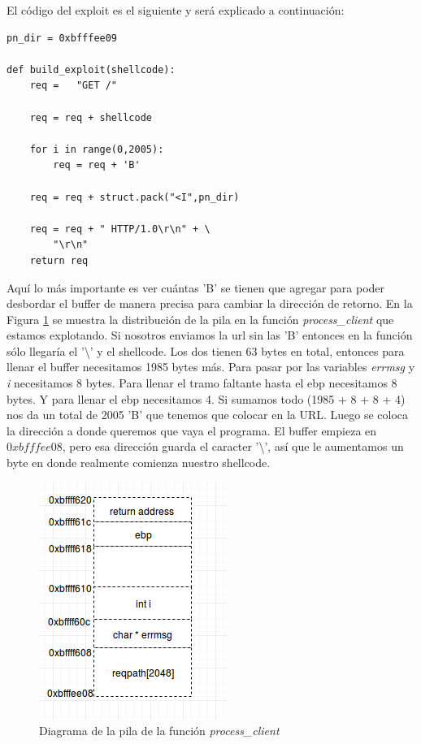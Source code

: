 \documentclass[a4paper,12pt]{article}
\begin{document}
El código del exploit es el siguiente y será explicado a continuación:

\begin{lstlisting}
pn_dir = 0xbfffee09

def build_exploit(shellcode):
    req =   "GET /"

    req = req + shellcode

    for i in range(0,2005):
        req = req + 'B'

    req = req + struct.pack("<I",pn_dir)

    req = req + " HTTP/1.0\r\n" + \
        "\r\n"
    return req
\end{lstlisting}


Aquí lo más importante es ver cuántas 'B' se tienen que agregar para poder desbordar el buffer de manera precisa para cambiar
la dirección de retorno. En la Figura \ref{fig:pila1} se muestra la distribución de la pila en la función \textit{process\_client}
que estamos explotando. Si nosotros enviamos la url sin las 'B' entonces en la función sólo llegaría el '\textbackslash' y el shellcode.
Los dos tienen 63 bytes en total, entonces para llenar el buffer necesitamos 1985 bytes más. Para pasar por las variables
\textit{errmsg} y \textit{i} necesitamos 8 bytes. Para llenar el tramo faltante hasta el ebp necesitamos 8 bytes. Y para llenar
el ebp necesitamos 4. Si sumamos todo (1985 + 8 + 8 + 4) nos da un total de 2005 'B' que tenemos que colocar en la URL.
Luego se coloca la dirección a donde queremos que vaya el programa. El buffer empieza en $0xbfffee08$, pero esa dirección
guarda el caracter '\textbackslash', así que le aumentamos un byte en donde realmente comienza nuestro shellcode.


\begin{figure}
 \centering
 \includegraphics[scale = 0.7]{pila1.png}
 \caption{Diagrama de la pila de la función \textit{process\_client}}
 \label{fig:pila1}
\end{figure}
\end{document}
